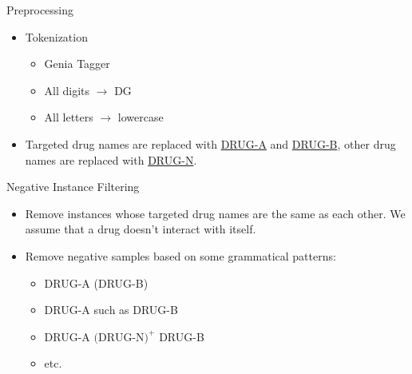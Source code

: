 \documentclass[xcolor={dvipsnames}]{beamer}
\begin{document}
\begin{frame}{\insertsubsection}

\begin{exampleblock}{Preprocessing}
\begin{itemize}
\item Tokenization
	\begin{itemize}
		\item Genia Tagger
		\item All digits $\to$ DG
		\item All letters $\to$ lowercase
	\end{itemize}
\item Targeted drug names are replaced with \underline{DRUG-A} and \underline{DRUG-B}, other drug names are replaced with \underline{DRUG-N}.
\end{itemize}
\end{exampleblock}

\end{frame}

\begin{frame}{\insertsubsection}

\begin{exampleblock}{Negative Instance Filtering}
\begin{itemize}
\item Remove instances whose targeted drug names are the same as each other. We assume that a drug doesn't interact with itself.
\item Remove negative samples based on some grammatical patterns:
	\begin{itemize}
		\item DRUG-A (DRUG-B)
		\item DRUG-A such as DRUG-B
		\item DRUG-A $\text{(DRUG-N)}^+$ DRUG-B
		\item etc.
	\end{itemize}
\end{itemize}
\end{exampleblock}

\end{frame}
\end{document}
